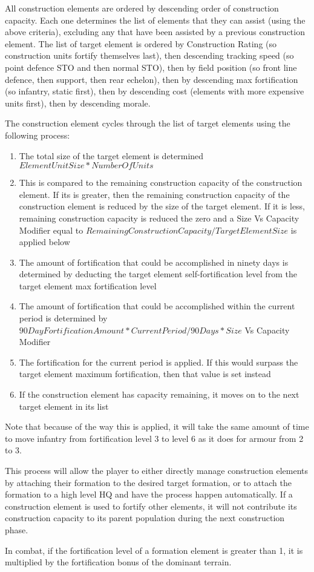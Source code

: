 \documentclass[../../Aurora C# unofficial manual.tex]{subfiles}
\begin{document}
	All construction elements are ordered by descending order of construction capacity. Each one determines the list of elements that they can assist (using the above criteria), excluding any that have been assisted by a previous construction element. The list of target element is ordered by Construction Rating (so construction units fortify themselves last), then descending tracking speed (so point defence STO and then normal STO), then by field position (so front line defence, then support, then rear echelon), then by descending max fortification (so infantry, static first), then by descending cost (elements with more expensive units first), then by descending morale.
	
	The construction element cycles through the list of target elements using the following process:
	\begin{enumerate}
		\item The total size of the target element is determined \( Element Unit Size * Number Of Units \)
		\item This is compared to the remaining construction capacity of the construction element. If its is greater, then the remaining construction capacity of the construction element is reduced by the size of the target element. If it is less, remaining construction capacity is reduced the zero and a Size Vs Capacity Modifier equal to \( Remaining Construction Capacity / Target Element Size \) is applied below
		\item The amount of fortification that could be accomplished in ninety days is determined by deducting the target element self-fortification level from the target element max fortification level
		\item The amount of fortification that could be accomplished within the current period is determined by \( 90 Day Fortification Amount * Current Period / 90 Days * Size \) Vs Capacity Modifier
		\item The fortification for the current period is applied. If this would surpass the target element maximum fortification, then that value is set instead
		\item If the construction element has capacity remaining, it moves on to the next target element in its list
	\end{enumerate}

	Note that because of the way this is applied, it will take the same amount of time to move infantry from fortification level 3 to level 6 as it does for armour from 2 to 3.
	
	This process will allow the player to either directly manage construction elements by attaching their formation to the desired target formation, or to attach the formation to a high level HQ and have the process happen automatically. If a construction element is used to fortify other elements, it will not contribute its construction capacity to its parent population during the next construction phase.
	
	In combat, if the fortification level of a formation element is greater than 1, it is multiplied by the fortification bonus of the dominant terrain.
\end{document}
